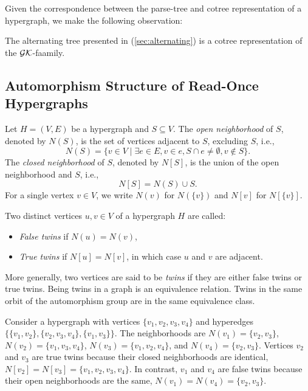 \cite{CLB81}

Given the correspondence between the parse-tree and cotree representation of a hypergraph, we make the following observation:

\begin{observation}
The alternating tree presented in \cite{Her04} (\ref{sec:alternating}) is a cotree representation of the $\mathcal{GK}$-faamily.
\end{observation}

\subsection{Automorphism Structure of Read-Once Hypergraphs}

\begin{definition}
Let $H=(V,E)$ be a hypergraph and $S\subseteq V$. The \emph{open neighborhood} of $S$, denoted by $N(S)$, is the set of vertices adjacent to $S$, excluding $S$, i.e.,
\[
N(S)=\{v\in V\mid\exists e\in E,v\in e,S\cap e\neq\emptyset,v\notin S\}.
\]
The \emph{closed neighborhood} of $S$, denoted by $N[S]$, is the union of the open neighborhood and $S$, i.e.,
\[
N[S]=N(S)\cup S.
\]
For a single vertex $v\in V$, we write $N(v)$ for $N(\{v\})$ and $N[v]$ for $N[\{v\}]$.
\end{definition}

\begin{definition}
Two distinct vertices $u,v\in V$ of a hypergraph $H$ are called:
\begin{itemize}
\item \emph{False twins} if $N(u)=N(v)$,
\item \emph{True twins} if $N[u]=N[v]$, in which case $u$ and $v$ are adjacent.
\end{itemize}
\end{definition}

More generally, two vertices are said to be \emph{twins} if they are either false twins or true twins. Being twins in a graph is an equivalence relation. Twins in the same orbit of the automorphism group are in the same equivalence class.

Consider a hypergraph with vertices $\{v_1,v_2,v_3,v_4\}$ and hyperedges $\{\{v_1,v_2\},\{v_2,v_3,v_4\},\{v_1,v_3\}\}$. The neighborhoods are $N(v_1)=\{v_2,v_3\}$, $N(v_2)=\{v_1,v_3,v_4\}$, $N(v_3)=\{v_1,v_2,v_4\}$, and $N(v_4)=\{v_2,v_3\}$. Vertices $v_2$ and $v_3$ are true twins because their closed neighborhoods are identical, $N[v_2]=N[v_3]=\{v_1,v_2,v_3,v_4\}$. In contrast, $v_1$ and $v_4$ are false twins because their open neighborhoods are the same, $N(v_1)=N(v_4)=\{v_2,v_3\}$.

